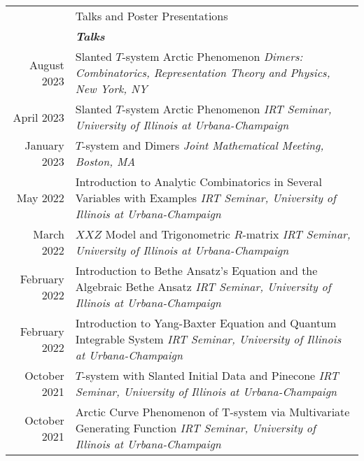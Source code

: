 \documentclass[letterpaper, 11pt]{article}
\newcommand{\headingfont}{\Large\color{Red}}
\newenvironment{SectionTable}[1]{
	\renewcommand*{\arraystretch}{1.7}
	\setlength{\tabcolsep}{10pt}
	\begin{longtable}{Rp{5.2in}} & #1 \\}
	{\end{longtable}\vspace{-.3cm}}
\begin{document}
	\begin{SectionTable}{\headingfont Talks and Poster Presentations}
		

		& \textit{\textbf{Talks}}\\
		
		August 2023 &
		Slanted $T$-system Arctic Phenomenon\newline
		\textit{Dimers: Combinatorics, Representation Theory and Physics, New York, NY} \\

		April 2023 &
		Slanted $T$-system Arctic Phenomenon\newline
		\textit{IRT Seminar, University of Illinois at Urbana-Champaign} \\

		January 2023 &
		$T$-system and Dimers\newline
		\textit{Joint Mathematical Meeting, Boston, MA} \\

		May 2022 &
		Introduction to Analytic Combinatorics in Several Variables with Examples \newline
		\textit{IRT Seminar, University of Illinois at Urbana-Champaign} \\

		March 2022 &
		$XXZ$ Model and Trigonometric $R$-matrix \newline
		\textit{IRT Seminar, University of Illinois at Urbana-Champaign} \\


		February 2022 &
		Introduction to Bethe Ansatz's Equation and the Algebraic Bethe Ansatz\newline
		\textit{IRT Seminar, University of Illinois at Urbana-Champaign} \\

		February 2022 &
		Introduction to Yang-Baxter Equation and Quantum Integrable System\newline
		\textit{IRT Seminar, University of Illinois at Urbana-Champaign} \\
		
		October 2021 &
		$T$-system with Slanted Initial Data and Pinecone \newline
		\textit{IRT Seminar, University of Illinois at Urbana-Champaign} \\
		

		October 2021 &
		Arctic Curve Phenomenon of T-system via Multivariate Generating Function\newline
		\textit{IRT Seminar, University of Illinois at Urbana-Champaign} \\
		

\end{SectionTable}
\end{document}
